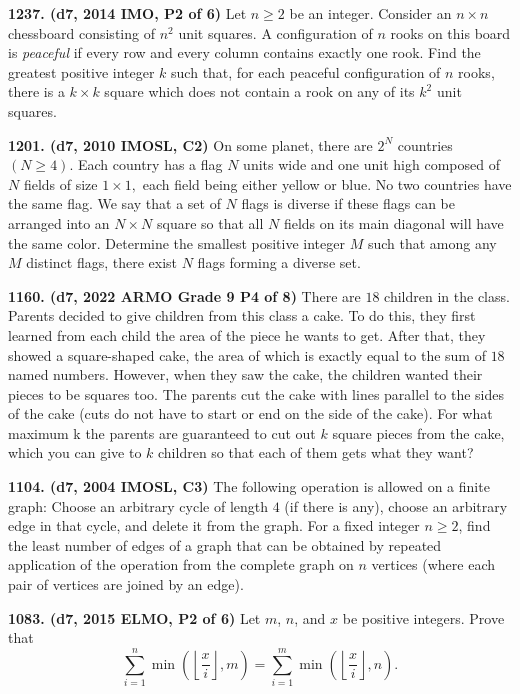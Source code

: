 \documentclass{article}
\begin{document}
        \textbf{1237. (\color{red}d7\color{black}, 2014 IMO, P2 of 6)} Let $n \ge 2$ be an integer. Consider an $n \times n$ chessboard consisting of $n^2$ unit squares. A configuration of $n$ rooks on this board is \textit{peaceful} if every row and every column contains exactly one rook. Find the greatest positive integer $k$ such that, for each peaceful configuration of $n$ rooks, there is a $k \times k$ square which does not contain a rook on any of its $k^2$ unit squares.

        \textbf{1201. (\color{red}d7\color{black}, 2010 IMOSL, C2)} On some planet, there are $2^N$ countries $(N \geq 4).$ Each country has a flag $N$ units wide and one unit high composed of $N$ fields of size $1 \times 1,$ each field being either yellow or blue. No two countries have the same flag. We say that a set of $N$ flags is diverse if these flags can be arranged into an $N \times N$ square so that all $N$ fields on its main diagonal will have the same color. Determine the smallest positive integer $M$ such that among any $M$ distinct flags, there exist $N$ flags forming a diverse set.

        \textbf{1160. (\color{red}d7\color{black}, 2022 ARMO Grade 9 P4 of 8)} There are $18$ children in the class. Parents decided to give children from this class a cake. To do this, they first learned from each child the area of the piece he wants to get. After that, they showed a square-shaped cake, the area of which is exactly equal to the sum of $18$ named numbers. However, when they saw the cake, the children wanted their pieces to be squares too. The parents cut the cake with lines parallel to the sides of the cake (cuts do not have to start or end on the side of the cake). For what maximum k the parents are guaranteed to cut out $k$ square pieces from the cake, which you can give to $k$ children so that each of them gets what they want?

        \textbf{1104. (\color{red}d7\color{black}, 2004 IMOSL, C3)} The following operation is allowed on a finite graph: Choose an arbitrary cycle of length $4$ (if there is any), choose an arbitrary edge in that cycle, and delete it from the graph. For a fixed integer $n\geq 2$, find the least number of edges of a graph that can be obtained by repeated application of the operation from the complete graph on $n$ vertices (where each pair of vertices are joined by an edge).

        \textbf{1083. (\color{red}d7\color{black}, 2015 ELMO, P2 of 6)} Let $m$, $n$, and $x$ be positive integers. Prove that $$ \sum_{i = 1}^n \min\left(\left\lfloor \frac{x}{i} \right\rfloor, m \right) = \sum_{i = 1}^m \min\left(\left\lfloor \frac{x}{i} \right\rfloor, n \right).$$
\end{document}
